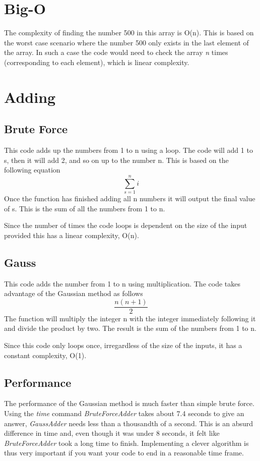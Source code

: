 \documentclass{article}
\begin{document}
\section{Big-O}
The complexity of finding the number 500 in this array is O(n). This is based on the worst case scenario where the number 500 only exists in the last element of the array. In such a case the code would need to check the array \textit{n} times (corresponding to each element), which is linear complexity.

\section{Adding}
\subsection{Brute Force}
This code adds up the numbers from 1 to n using a loop. The code will add 1 to s, then it will add 2, and so on up to the number n. This is based on the following equation 
\begin{equation}
    \sum_{s=1}^{n} i
\end{equation}
Once the function has finished adding all n numbers it will output the final value of s. This is the sum of all the numbers from 1 to n.

Since the number of times the code loops is dependent on the size of the input provided this has a linear complexity, O(n).

\subsection{Gauss}
This code adds the number from 1 to n using multiplication. The code takes advantage of the Gaussian method as follows
\begin{equation}
    \frac{n(n+1)}{2}
\end{equation}
The function will multiply the integer n with the integer immediately following it and divide the product by two. The result is the sum of the numbers from 1 to n.

Since this code only loops once, irregardless of the size of the inputs, it has a constant complexity, O(1). 

\subsection{Performance}
The performance of the Gaussian method is much faster than simple brute force. Using the \textit{time} command \textit{BruteForceAdder} takes about 7.4 seconds to give an answer, \textit{GaussAdder} needs less than a thousandth of a second. This is an absurd difference in time and, even though it was under 8 seconds, it felt like \textit{BruteForceAdder} took a long time to finish. Implementing a clever algorithm is thus very important if you want your code to end in a reasonable time frame.
\end{document}
